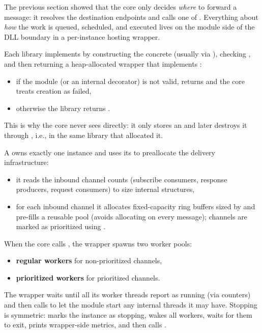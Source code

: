 The previous section showed that the core only decides \emph{where} to forward a message: it resolves the destination endpoints and calls one of
.
Everything about \emph{how} the work is queued, scheduled, and executed lives on the module side of the DLL boundary in a per-instance hosting wrapper.

Each library implements  by constructing the concrete  (usually via ), checking , and then returning a heap-allocated wrapper that implements :
\begin{itemize}
    \item if the module (or an internal decorator) is not valid,  returns  and the core treats creation as failed,
    \item otherwise the library returns .
\end{itemize}
This is why the core never sees  directly: it only stores an  and later destroys it through , i.e., in the same library that allocated it.

A  owns exactly one  instance and uses its  to preallocate the delivery infrastructure:
\begin{itemize}
    \item it reads the inbound channel counts (subscribe consumers, response producers, request consumers) to size internal structures,
    \item for each inbound channel it allocates fixed-capacity ring buffers sized by  and pre-fills a reusable  pool (avoids allocating on every message); channels are marked as prioritized using .
\end{itemize}

When the core calls , the wrapper spawns two worker pools:
\begin{itemize}
    \item \textbf{regular workers} for non-prioritized channels,
    \item \textbf{prioritized workers} for prioritized channels.
\end{itemize}
The wrapper waits until all its worker threads report as running (via counters) and then calls  to let the module start any internal threads it may have.
Stopping is symmetric:  marks the instance as stopping, wakes all workers, waits for them to exit, prints wrapper-side metrics, and then calls .

